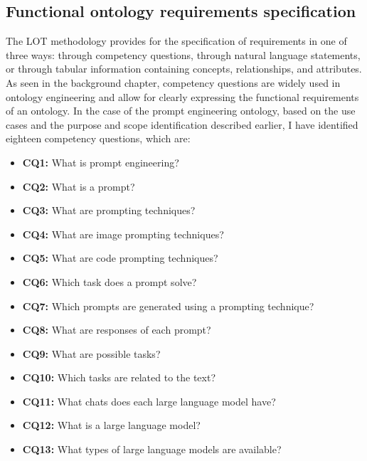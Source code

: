 \subsection{Functional ontology requirements specification}
The LOT methodology provides for the specification of requirements in one of three ways: through competency questions, through natural language statements, or through tabular information containing concepts, relationships, and attributes. As seen in the background chapter, competency questions are widely used in ontology engineering and allow for clearly expressing the functional requirements of an ontology. In the case of the prompt engineering ontology, based on the use cases and the purpose and scope identification described earlier, I have identified eighteen competency questions, which are:
\begin{itemize}
    \item \textbf{CQ1:} What is prompt engineering?

    \item \textbf{CQ2:} What is a prompt?

    \item \textbf{CQ3:} What are prompting techniques?

    \item \textbf{CQ4:} What are image prompting techniques?

    \item \textbf{CQ5:} What are code prompting techniques?

    \item \textbf{CQ6:} Which task does a prompt solve?

    \item \textbf{CQ7:} Which prompts are generated using a prompting technique?

    \item \textbf{CQ8:} What are responses of each prompt?

    \item \textbf{CQ9:} What are possible tasks?

    \item \textbf{CQ10:} Which tasks are related to the text?

    \item \textbf{CQ11:} What chats does each large language model have?

    \item \textbf{CQ12:} What is a large language model?

    \item \textbf{CQ13:} What types of large language models are available?


\end{itemize}
